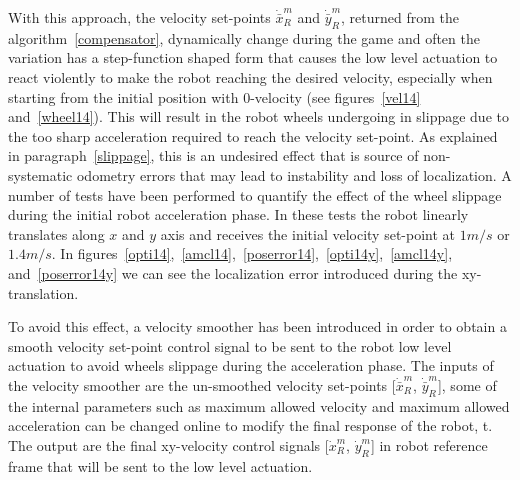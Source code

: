 With this approach, the velocity set-points $\dot{\bar{x}}_R^m$ and $\dot{\bar{y}}_R^m$, returned from the algorithm~\ref{compensator}, dynamically change during the game and often the variation has a step-function shaped form that causes the low level actuation to react violently to make the robot reaching the desired velocity, especially when starting from the initial position with 0-velocity (see figures~\ref{vel14} and~\ref{wheel14}).
This will result in the robot wheels undergoing in slippage due to the too sharp acceleration required to reach the velocity set-point. As explained in paragraph~\ref{slippage}, this is an undesired effect that is source of non-systematic odometry errors that may lead to instability and loss of localization. A number of tests have been performed to quantify the effect of the wheel slippage during the initial robot acceleration phase. In these tests the robot linearly translates along $x$ and $y$ axis and receives the initial velocity set-point at $1m/s$ or $1.4m/s$. In figures~\ref{opti14},~\ref{amcl14},~\ref{poserror14},~\ref{opti14y},~\ref{amcl14y}, and~\ref{poserror14y} we can see the localization error introduced during the xy-translation.

To avoid this effect, a velocity smoother has been introduced in order to obtain a smooth velocity set-point control signal to be sent to the robot low level actuation to avoid wheels slippage during the  acceleration phase. The inputs of the velocity smoother are the un-smoothed velocity set-points [$\dot{\bar{x}}_R^m$, $\dot{\bar{y}}_R^m$], some of the internal parameters such as maximum allowed velocity and maximum allowed acceleration can be changed online to modify the final response of the robot, t. The output are the final xy-velocity control signals [$\dot{x}_R^m$, $\dot{y}_R^m$] in robot reference frame that will be sent to the low level actuation.

